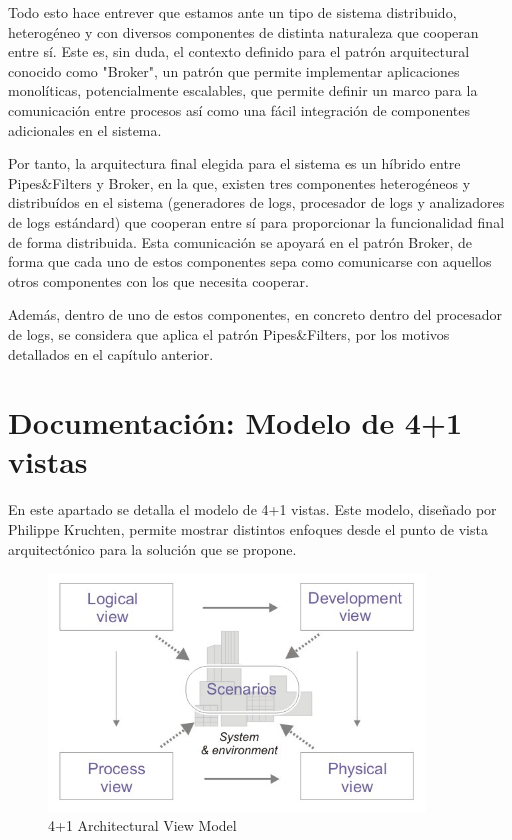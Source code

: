 \documentclass[11pt]{article}
\begin{document}
Todo esto hace entrever que estamos ante un tipo de sistema distribuido, heterogéneo y con diversos componentes de distinta naturaleza que cooperan entre sí. Este es, sin duda, el contexto definido para el patrón arquitectural conocido como "Broker", un patrón que permite implementar aplicaciones monolíticas, potencialmente escalables, que permite definir un marco para la comunicación entre procesos así como una fácil integración de componentes adicionales en el sistema.

Por tanto, la arquitectura final elegida para el sistema es un híbrido entre Pipes\&Filters y Broker, en la que, existen tres componentes heterogéneos y distribuídos en el sistema (generadores de logs, procesador de logs y analizadores de logs estándard) que cooperan entre sí para proporcionar la funcionalidad final de forma distribuida. Esta comunicación se apoyará en el patrón Broker, de forma que cada uno de estos componentes sepa como comunicarse con aquellos otros componentes con los que necesita cooperar.

Además, dentro de uno de estos componentes, en concreto dentro del procesador de logs, se considera que aplica el patrón Pipes\&Filters, por los motivos detallados en el capítulo anterior.

\pagebreak

\section{Documentación: Modelo de 4+1 vistas}

En este apartado se detalla el modelo de 4+1 vistas. Este modelo, diseñado por Philippe Kruchten, permite mostrar distintos enfoques desde el punto de vista arquitectónico para la solución que se propone.

\begin{center}
 \begin{figure}[H]
 \begin{center}
   \includegraphics[width=10cm]{img/4+1view.jpg}
   \caption{4+1 Architectural View Model}
   \label{fig:4plus1views}
 \end{center}
 \end{figure}
\end{center}
\end{document}
